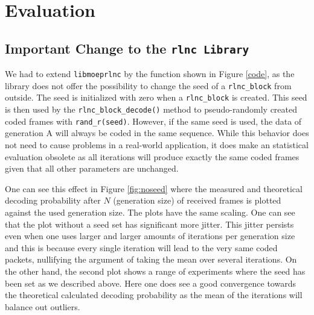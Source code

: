 \documentclass[a4paper,english,10pt]{tumarticle}
\begin{document}
\section{Evaluation}\label{sec:eval}
\subsection{Important Change to the \texttt{rlnc Library}}
We had to extend \texttt{libmoeprlnc} by the function shown in Figure \ref{code}, as the 
library does not offer the possibility to change the seed of a \texttt{rlnc\_block} from outside. The seed is 
initialized with zero when a \texttt{rlnc\_block} is created. This seed is then used by the \texttt{rlnc\_block\_decode()}
method to pseudo-randomly created coded frames with \texttt{rand\_r(seed)}. However, if the same seed is used, the 
data of generation A will always be coded in the same sequence. 
While this behavior does not need to cause problems in a real-world application, it does make an statistical evaluation obsolete as all iterations will produce exactly the same coded frames given that all other parameters are unchanged.

One can see this effect in Figure \ref{fig:noseed} where the measured and theoretical decoding probability after $N$ (generation size) of received frames is plotted against the used generation size. The plots have the same scaling. One can see that the plot without a seed set has significant more jitter. This jitter persists even when one uses larger and larger amounts of iterations per generation size and this is because every single iteration will lead to the very same coded packets, nullifying the argument of taking the mean over several iterations. On the other hand, the second plot shows a range of experiments where the seed has been set as we described above. Here one does see a good convergence towards the theoretical calculated decoding probability as the mean of the iterations will balance out outliers.

\end{document}
